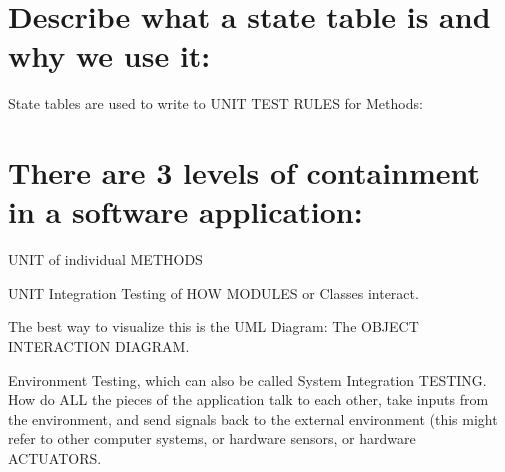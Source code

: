 \section{Describe what a state table is and why we use it:}
 
State tables are used to write to UNIT TEST RULES for Methods:


\section{There are 3 levels of containment in a software application:}

\item UNIT of individual METHODS

\subitem UNIT Integration Testing of HOW MODULES or Classes interact.

\item The best way to visualize this is the UML Diagram: The OBJECT INTERACTION DIAGRAM.

\item Environment Testing, which can also be called System Integration TESTING.
How do ALL the pieces of the application talk to each other, take inputs from the environment, and send signals back to the external environment (this might refer to other computer systems, or hardware sensors, or hardware ACTUATORS.  